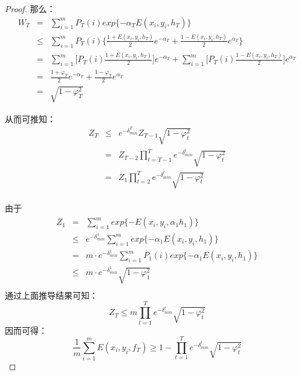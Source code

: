 \begin{proof}
那么：
\begin{equation}
    \begin{array}{lll}
       W_T & = & \sum\limits_{i=1}^m P_T(i) exp\{-\alpha_T E(x_i, y_i, h_T)\} \\
       & \le & \sum\limits_{i=1}^m P_T(i) \bigg\{\frac{1+E(x_i,y_i,h_T)}{2} e^{-\alpha_T} + \frac{1-E(x_i,y_i,h_T)}{2} e^{\alpha_T} \bigg\} \\
       & = & \sum\limits_{i=1}^m \bigg[P_T(i) \frac{1+E(x_i,y_i,h_T)}{2}\bigg]e^{-\alpha_T}  + \sum\limits_{i=1}^m \bigg[P_T(i) \frac{1-E(x_i,y_i,h_T)}{2}\bigg] e^{\alpha_T} \\
       & = &  \frac{1+\varphi_T}{2} e^{-\alpha_T} + \frac{1-\varphi_T}{2} e^{\alpha_T} \\
       & = & \sqrt{1-\varphi_T^2}
    \end{array}
\end{equation}

从而可推知：
\begin{equation}
    \begin{array}{lll}
       Z_T & \le &  e^{-\delta_{min}^T} Z_{T-1} \sqrt{1-\varphi_t^2} \\
       & = & Z_{T-2} \prod\limits_{t=T-1}^T e^{-\delta_{min}^t} \sqrt{1-\varphi_t^2} \\
       & = & Z_1 \prod\limits_{t=2}^T e^{-\delta_{min}^t} \sqrt{1-\varphi_t^2} \\
    \end{array}
\end{equation}

由于
\begin{equation}
    \begin{array}{lll}
      Z_1 & = & \sum\limits_{i=1}^m exp\{-E(x_i,y_i, \alpha_1 h_1)\} \\
       & \le & e^{-\delta_{min}^1} \sum\limits_{i=1}^m exp\{-\alpha_1 E(x_i,y_i, h_1)\} \\
       & = & m \cdot e^{-\delta_{min}^1} \sum\limits_{i=1}^m P_1(i) exp\{-\alpha_1 E(x_i,y_i, h_1)\} \\
       & \le &  m \cdot e^{-\delta_{min}^1} \sqrt{1-\varphi_1^2} \\
    \end{array}
\end{equation}
通过上面推导结果可知：
\begin{equation}
    Z_T \le m \prod\limits_{t=1}^T e^{-\delta_{min}^t} \sqrt{1-\varphi_t^2}
\end{equation}
因而可得：
\begin{equation}\label{eq:adaranktheorem}
    \frac{1}{m} \sum\limits_{i=1}^m E(x_i, y_i, f_T) \ge 1- \prod\limits_{t=1}^T e^{-\delta_{min}^t} \sqrt{1-\varphi_t^2}
\end{equation}
\end{proof}

